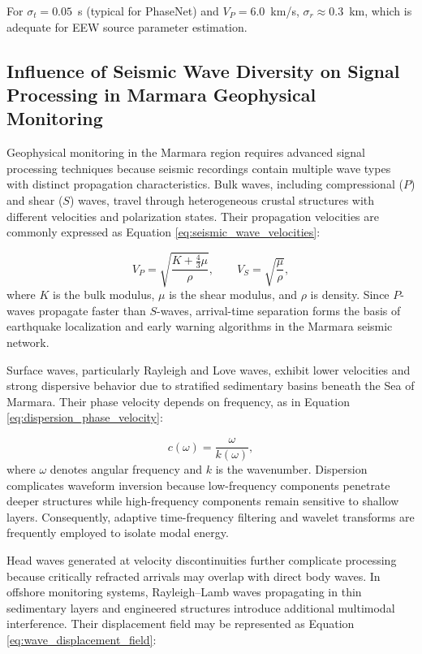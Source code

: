 \documentclass[data,article,accept,pdftex,moreauthors]{Definitions/mdpi}
\begin{document}
For $\sigma_t = 0.05$~s (typical for PhaseNet) and $V_P = 6.0$~km/s, $\sigma_r \approx 0.3$~km, which is adequate for EEW source parameter estimation.

\subsection{Influence of Seismic Wave Diversity on Signal Processing in Marmara Geophysical Monitoring}

Geophysical monitoring in the Marmara region requires advanced signal processing techniques because seismic recordings contain multiple wave types with distinct propagation characteristics. Bulk waves, including compressional ($P$) and shear ($S$) waves, travel through heterogeneous crustal structures with different velocities and polarization states. Their propagation velocities are commonly expressed as Equation \eqref{eq:seismic_wave_velocities}:

\begin{equation}
\label{eq:seismic_wave_velocities}
V_P = \sqrt{\frac{K + \frac{4}{3}\mu}{\rho}},
\qquad
V_S = \sqrt{\frac{\mu}{\rho}},
\end{equation}
where $K$ is the bulk modulus, $\mu$ is the shear modulus, and $\rho$ is density. Since $P$-waves propagate faster than $S$-waves, arrival-time separation forms the basis of earthquake localization and early warning algorithms in the Marmara seismic network.

Surface waves, particularly Rayleigh and Love waves, exhibit lower velocities and strong dispersive behavior due to stratified sedimentary basins beneath the Sea of Marmara. Their phase velocity depends on frequency, as in Equation \eqref{eq:dispersion_phase_velocity}:

\begin{equation}
\label{eq:dispersion_phase_velocity}
c(\omega) = \frac{\omega}{k(\omega)},
\end{equation}
where $\omega$ denotes angular frequency and $k$ is the wavenumber. Dispersion complicates waveform inversion because low-frequency components penetrate deeper structures while high-frequency components remain sensitive to shallow layers. Consequently, adaptive time-frequency filtering and wavelet transforms are frequently employed to isolate \linebreak modal energy.

Head waves generated at velocity discontinuities further complicate processing because critically refracted arrivals may overlap with direct body waves. In offshore monitoring systems, Rayleigh--Lamb waves propagating in thin sedimentary layers and engineered structures introduce additional multimodal interference. Their displacement field may be represented as Equation \eqref{eq:wave_displacement_field}:
\end{document}
